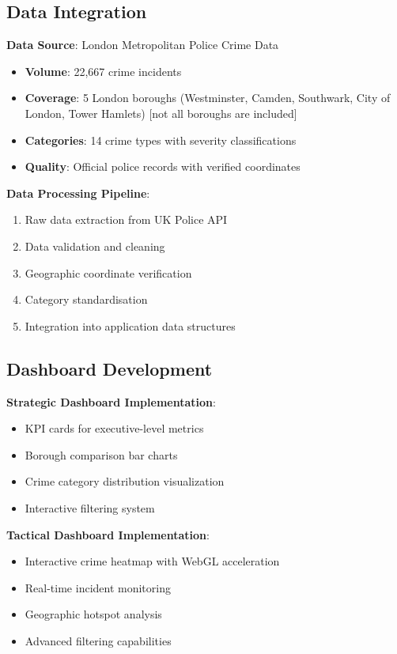 \documentclass[12pt,a4paper]{article}
\begin{document}
\subsection{Data Integration}

\textbf{Data Source}: London Metropolitan Police Crime Data
\begin{itemize}
    \item \textbf{Volume}: 22,667 crime incidents
    \item \textbf{Coverage}: 5 London boroughs (Westminster, Camden, Southwark, City of London, Tower Hamlets) [not all boroughs are included]
    \item \textbf{Categories}: 14 crime types with severity classifications
    \item \textbf{Quality}: Official police records with verified coordinates
\end{itemize}

\textbf{Data Processing Pipeline}:
\begin{enumerate}
    \item Raw data extraction from UK Police API
    \item Data validation and cleaning
    \item Geographic coordinate verification
    \item Category standardisation
    \item Integration into application data structures
\end{enumerate}

\subsection{Dashboard Development}

\textbf{Strategic Dashboard Implementation}:
\begin{itemize}
    \item KPI cards for executive-level metrics
    \item Borough comparison bar charts
    \item Crime category distribution visualization
    \item Interactive filtering system
\end{itemize}

\textbf{Tactical Dashboard Implementation}:
\begin{itemize}
    \item Interactive crime heatmap with WebGL acceleration
    \item Real-time incident monitoring
    \item Geographic hotspot analysis
    \item Advanced filtering capabilities
\end{itemize}
\end{document}
